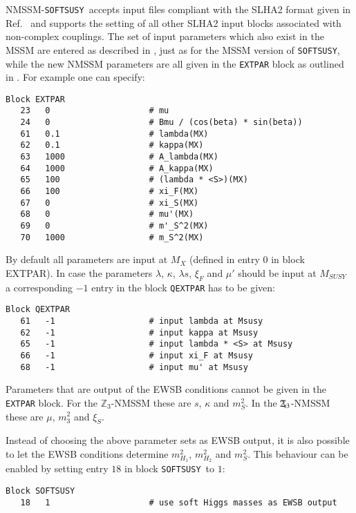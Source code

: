 \documentclass[final,3p,times,pdflatex]{elsarticle}
\def\SOFTSUSY{{\tt SOFTSUSY}}
\def\code#1{\small{\tt #1}\normalsize}
\newcommand{\Zv}{\,\mathbf{\backslash}\mkern-11.0mu{\mathbb{Z}}_{3}} %
\begin{document}
NMSSM-\SOFTSUSY\ accepts input files compliant with the SLHA2 format given in Ref.~\cite{Allanach:2008qq} and supports the setting of all other SLHA2
input blocks associated with non-complex couplings.  The set of input
parameters which also exist in the MSSM are entered as described in
\cite{Skands:2003cj}, just as for the MSSM version of \SOFTSUSY, while
the new NMSSM parameters are all given in the \code{EXTPAR} block as
outlined in \cite{Allanach:2008qq}.  For example one can specify:
%
\begin{verbatim}
Block EXTPAR
   23   0                    # mu
   24   0                    # Bmu / (cos(beta) * sin(beta))
   61   0.1                  # lambda(MX)
   62   0.1                  # kappa(MX)
   63   1000                 # A_lambda(MX)
   64   1000                 # A_kappa(MX)
   65   100                  # (lambda * <S>)(MX)
   66   100                  # xi_F(MX)
   67   0                    # xi_S(MX)
   68   0                    # mu'(MX)
   69   0                    # m'_S^2(MX)
   70   1000                 # m_S^2(MX)
\end{verbatim}
%
By default all parameters are input at $M_X$ (defined in entry 0 in
block EXTPAR).  In case the parameters $\lambda$, $\kappa$, $\lambda
s$, $\xi_F$ and $\mu'$ should be input at $M_{SUSY}$ a corresponding
$-1$ entry in the block \code{QEXTPAR} has to be given:
%
\begin{verbatim}
Block QEXTPAR
   61   -1                   # input lambda at Msusy
   62   -1                   # input kappa at Msusy
   65   -1                   # input lambda * <S> at Msusy
   66   -1                   # input xi_F at Msusy
   68   -1                   # input mu' at Msusy
\end{verbatim}
%
Parameters that are output of the EWSB conditions cannot be given in
the \code{EXTPAR} block.  For the $\mathbb{Z}_3$-NMSSM these are $s$,
$\kappa$ and $m_S^2$.  In the $\Zv$-NMSSM these are $\mu$, $m_3^2$ and
$\xi_S$.

Instead of choosing the above parameter sets as EWSB output, it is also
possible to let the EWSB conditions determine $m_{H_1}^2$, $m_{H_2}^2$
and $m_S^2$.  This behaviour can be enabled by setting entry $18$ in
block \SOFTSUSY\ to $1$:
%
\begin{verbatim}
Block SOFTSUSY
   18   1                    # use soft Higgs masses as EWSB output
\end{verbatim}


\end{document}

